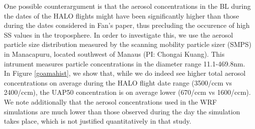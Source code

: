 \documentclass{article}
\begin{document}
One possible counterargument is that the aerosol concentrations in the BL during the dates of the HALO flights might have been significantly higher than those during the dates considered in Fan's paper, thus precluding the occurence of high SS values in the troposphere. In order to investigate this, we use the aerosol particle size distribution measured by the scanning mobility particle sizer (SMPS) in Manacapuru, located southwest of Manaus (PI: Chongai Kuang). This intrument measures particle concentrations in the diameter range 11.1-469.8nm. In Figure \ref{goamahist}, we show that, while we do indeed see higher total aerosol concentrations on average during the HALO flight date range (3500/ccm vs 2400/ccm), the UAP50 concentration is on average lower (670/ccm vs 1600/ccm). We note additionally that the aerosol concentrations used in the WRF simulations are much lower than those observed during the day the simulation takes place, which is not justified quantitatively in that study.
\end{document}
